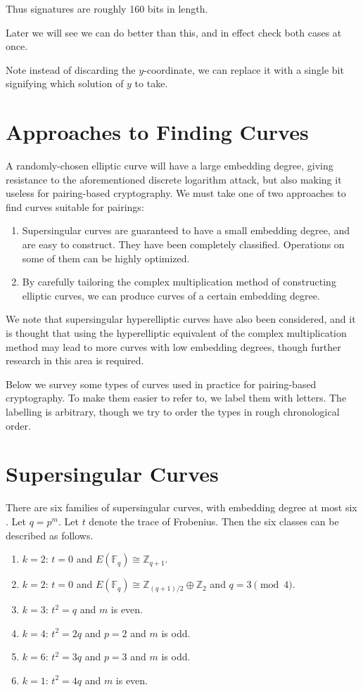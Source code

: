 Thus signatures are roughly 160 bits in length.

Later we will see we can do better than this, and in effect check both
cases at once.

Note instead of discarding the $y$-coordinate, we can
replace it with a single bit signifying which solution of $y$ to take.

\section { Approaches to Finding Curves }

A randomly-chosen elliptic curve will have a large embedding
degree, giving resistance to the aforementioned discrete logarithm
attack, but also making it useless for pairing-based cryptography.
We must take one of two approaches to find curves suitable for pairings:

\begin{enumerate}
\item
Supersingular curves are guaranteed to have a small embedding degree,
and are easy to construct. They have been completely classified. Operations
on some of them can be highly optimized.
\item
By carefully tailoring the complex multiplication method of constructing
elliptic curves, we can produce curves of a certain embedding degree. 
\end{enumerate}

We note that supersingular hyperelliptic curves have also been considered,
and it is thought that using the hyperelliptic equivalent of the
complex multiplication method may lead to more curves with low
embedding degrees, though further research in this area is required.

Below we survey some types of curves used in practice for pairing-based
cryptography. To make them easier to refer to, we label them with letters.
The labelling is arbitrary, though we try to order the types
in rough chronological order.

\section { Supersingular Curves }

There are six families of supersingular curves, with embedding degree at
most six \cite{mov}. Let $q=p^m$. Let $t$ denote the trace of Frobenius.
Then the six classes can be described as follows.

\begin{enumerate}
\item
$k = 2$: $ t = 0$ and $E(\mathbb{F}_q) \cong \mathbb{Z}_{q+1}$.
\item
$k = 2$: $ t = 0$ and $E(\mathbb{F}_q) \cong \mathbb{Z}_{(q+1)/2} \oplus \mathbb{Z}_2$ and $q = 3 \pmod{4}$.
\item
$k = 3$: $ t^2 = q$ and $m$ is even.
\item
$k = 4$: $ t^2 = 2q$ and $p = 2$ and $m$ is odd.
\item
$k = 6$: $ t^2 = 3q$ and $p = 3$ and $m$ is odd.
\item
$k = 1$: $ t^2 = 4q$ and $m$ is even.
\end{enumerate}

